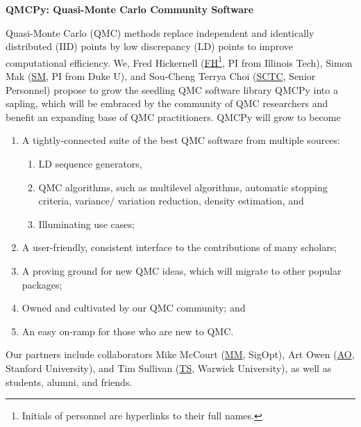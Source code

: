 \documentclass[11pt]{NSFamsart}
\newcommand{\FH}{\hyperlink{FHlink}{FH}\xspace}
\newcommand{\SM}{\hyperlink{SMlink}{SM}\xspace}
\newcommand{\SCTC}{\hyperlink{SCTClink}{SCTC}\xspace}
\newcommand{\AO}{\hyperlink{AOlink}{AO}\xspace}
\newcommand{\MM}{\hyperlink{MMlink}{MM}\xspace}
\newcommand{\TS}{\hyperlink{TSlink}{TS}\xspace}
\begin{document}

\begin{center}
\Large \textbf{
QMCPy: Quasi-Monte Carlo Community Software\\
}
\end{center}
\vspace{-2ex}

\setcounter{tocdepth}{1}
\tableofcontents

\vspace{-6ex}


Quasi-Monte Carlo (QMC) methods replace independent and identically distributed (IID) points by low discrepancy (LD) points to improve computational efficiency.  We, \hypertarget{FHlink}{Fred Hickernell} (\FH\footnote{Initials of personnel are hyperlinks to their full names.}, PI from Illinois Tech), \hypertarget{SMlink}{Simon Mak} (\SM, PI from Duke U), and \hypertarget{SCTClink}{Sou-Cheng Terrya Choi} (\SCTC, Senior Personnel) propose to grow the seedling QMC software library QMCPy \cite{QMCPy2020a} into a sapling, which will be embraced by the community of QMC researchers and benefit an expanding base of QMC practitioners.  QMCPy will grow to become
\begin{enumerate}
\renewcommand{\labelenumi}{\arabic{enumi}.}
    \item A tightly-connected suite of the best QMC software from multiple sources:
    \begin{enumerate}
    \renewcommand{\labelenumii}{\alph{enumii}.}
        \item LD sequence generators,
        \item QMC algorithms, such as multilevel algorithms, automatic stopping criteria, variance/ variation reduction, density estimation, and
        \item Illuminating use cases;
    \end{enumerate}
    \item A user-friendly, consistent interface to the contributions of many scholars;
    \item A proving ground for new QMC ideas, which will migrate to other popular packages;
    \item Owned and cultivated by our QMC community; and
    \item An easy on-ramp for those who are new to QMC.
\end{enumerate}
Our partners include  collaborators \hypertarget{MMlink}{Mike McCourt} (\MM, SigOpt), \hypertarget{AOlink}{Art Owen} (\AO, Stanford University), and \hypertarget{TSlink}{Tim Sullivan} (\TS, Warwick University), as well as students, alumni, and friends.
\end{document}
